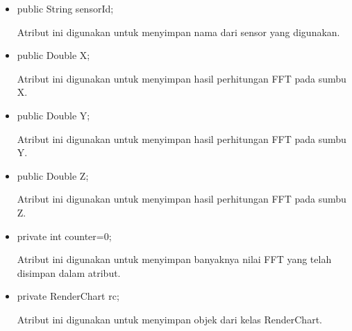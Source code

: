 \begin{itemize}
    \item public String sensorId;
    
    Atribut ini digunakan untuk menyimpan nama dari sensor yang digunakan.
    
    \item public Double X;
    
    Atribut ini digunakan untuk menyimpan hasil perhitungan FFT pada sumbu X.
    
    \item public Double Y;
    
    Atribut ini digunakan untuk menyimpan hasil perhitungan FFT pada sumbu Y.
    
    \item public Double Z;
    
    Atribut ini digunakan untuk menyimpan hasil perhitungan FFT pada sumbu Z.
    
    \item private int counter=0;
    
    Atribut ini digunakan untuk menyimpan banyaknya nilai FFT yang telah disimpan dalam atribut.
    
    \item private RenderChart rc;
    
    Atribut ini digunakan untuk menyimpan objek dari kelas RenderChart.
\end{itemize}

